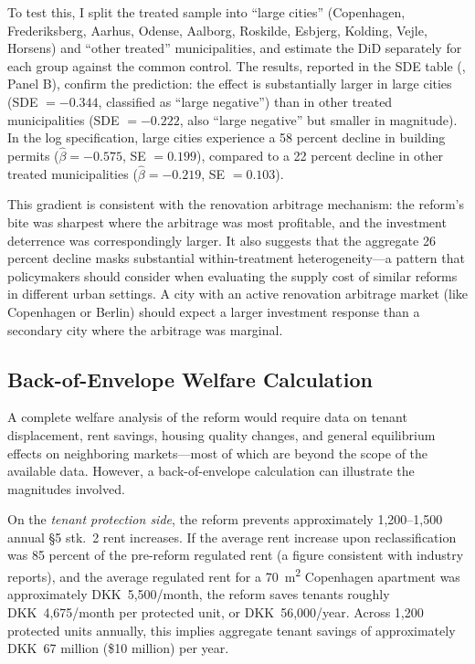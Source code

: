 \documentclass[12pt]{article}
\begin{document}
To test this, I split the treated sample into ``large cities'' (Copenhagen, Frederiksberg, Aarhus, Odense, Aalborg, Roskilde, Esbjerg, Kolding, Vejle, Horsens) and ``other treated'' municipalities, and estimate the DiD separately for each group against the common control. The results, reported in the SDE table (, Panel B), confirm the prediction: the effect is substantially larger in large cities (SDE $= -0.344$, classified as ``large negative'') than in other treated municipalities (SDE $= -0.222$, also ``large negative'' but smaller in magnitude). In the log specification, large cities experience a 58 percent decline in building permits ($\hat{\beta} = -0.575$, SE $= 0.199$), compared to a 22 percent decline in other treated municipalities ($\hat{\beta} = -0.219$, SE $= 0.103$).

This gradient is consistent with the renovation arbitrage mechanism: the reform's bite was sharpest where the arbitrage was most profitable, and the investment deterrence was correspondingly larger. It also suggests that the aggregate 26 percent decline masks substantial within-treatment heterogeneity---a pattern that policymakers should consider when evaluating the supply cost of similar reforms in different urban settings. A city with an active renovation arbitrage market (like Copenhagen or Berlin) should expect a larger investment response than a secondary city where the arbitrage was marginal.

\subsection{Back-of-Envelope Welfare Calculation}

A complete welfare analysis of the reform would require data on tenant displacement, rent savings, housing quality changes, and general equilibrium effects on neighboring markets---most of which are beyond the scope of the available data. However, a back-of-envelope calculation can illustrate the magnitudes involved.

On the \emph{tenant protection side}, the reform prevents approximately 1,200--1,500 annual \S5 stk.\ 2 rent increases. If the average rent increase upon reclassification was 85 percent of the pre-reform regulated rent (a figure consistent with industry reports), and the average regulated rent for a 70~m\textsuperscript{2} Copenhagen apartment was approximately DKK~5,500/month, the reform saves tenants roughly DKK~4,675/month per protected unit, or DKK~56,000/year. Across 1,200 protected units annually, this implies aggregate tenant savings of approximately DKK~67 million (\$10 million) per year.
\end{document}
